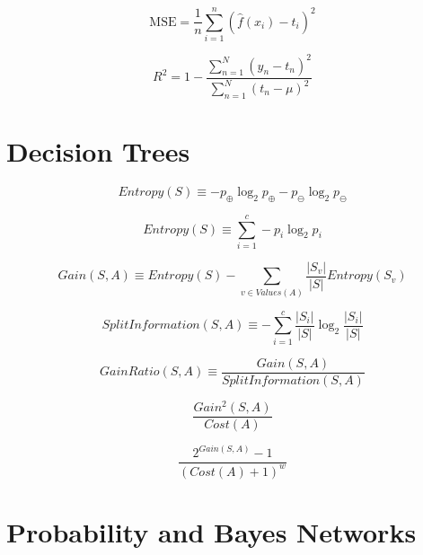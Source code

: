 \documentclass{article}
\begin{document}
\begin{equation}
    \text{MSE} = \frac{1}{n} \sum_{i=1}^n (\hat{f}(x_i) - t_i)^2
\end{equation}

\begin{equation}
    R^2 = 1 - \frac{\sum_{n=1}^N (y_n - t_n)^2}{\sum_{n=1}^N (t_n - \mu)^2}
\end{equation}


\section{Decision Trees}

\begin{equation}
    Entropy(S) \equiv -p_{\oplus} \log_2 p_{\oplus} - p_{\ominus} \log_2 p_{\ominus}
\end{equation}

\begin{equation}
    Entropy(S) \equiv \sum_{i=1}^c -p_i \log_2 p_i
\end{equation}

\begin{equation}
    Gain(S, A) \equiv Entropy(S) - \sum_{v \in Values(A)} \frac{|S_v|}{|S|} Entropy(S_v)
\end{equation}

\begin{equation}
    SplitInformation(S, A) \equiv - \sum_{i=1}^c \frac{|S_i|}{|S|} \log_2 \frac{|S_i|}{|S|}
\end{equation}

\begin{equation}
    GainRatio(S, A) \equiv \frac{Gain(S, A)}{SplitInformation(S, A)}
\end{equation}

\begin{equation}
    \frac{Gain^2(S, A)}{Cost(A)}
\end{equation}

\begin{equation}
    \frac{2^{Gain(S, A)} - 1}{(Cost(A) + 1)^w}
\end{equation}


\section{Probability and Bayes Networks}
\end{document}
